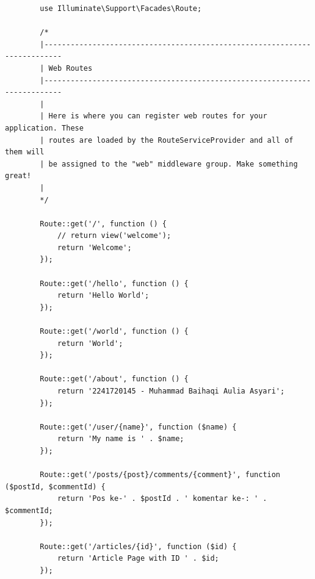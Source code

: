 \documentclass[12pt,titlepage]{article}
\begin{document}
\begin{enumerate}[label=\alph*.]
\begin{verbatim}
        use Illuminate\Support\Facades\Route;
        
        /*
        |--------------------------------------------------------------------------
        | Web Routes
        |--------------------------------------------------------------------------
        |
        | Here is where you can register web routes for your application. These
        | routes are loaded by the RouteServiceProvider and all of them will
        | be assigned to the "web" middleware group. Make something great!
        |
        */
        
        Route::get('/', function () {
            // return view('welcome');
            return 'Welcome';
        });
        
        Route::get('/hello', function () {
            return 'Hello World';
        });
        
        Route::get('/world', function () {
            return 'World';
        }); 
        
        Route::get('/about', function () {
            return '2241720145 - Muhammad Baihaqi Aulia Asyari';
        }); 
        
        Route::get('/user/{name}', function ($name) {
            return 'My name is ' . $name;
        }); 
        
        Route::get('/posts/{post}/comments/{comment}', function ($postId, $commentId) {
            return 'Pos ke-' . $postId . ' komentar ke-: ' . $commentId;
        });
        
        Route::get('/articles/{id}', function ($id) {
            return 'Article Page with ID ' . $id;
        });        
    \end{verbatim}
\end{enumerate}
\end{document}
